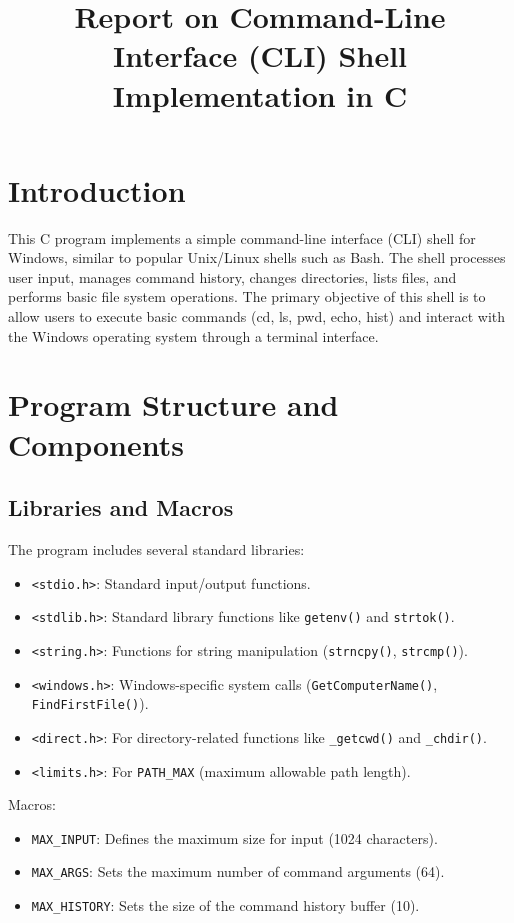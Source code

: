 \documentclass{article}
\title{Report on Command-Line Interface (CLI) Shell Implementation in C}
\author{}
\date{}
\begin{document}
\maketitle

\section{Introduction}

This C program implements a simple command-line interface (CLI) shell for Windows, similar to popular Unix/Linux shells such as Bash. The shell processes user input, manages command history, changes directories, lists files, and performs basic file system operations. The primary objective of this shell is to allow users to execute basic commands (cd, ls, pwd, echo, hist) and interact with the Windows operating system through a terminal interface.

\section{Program Structure and Components}

\subsection{Libraries and Macros}

The program includes several standard libraries:

\begin{itemize}
\item \texttt{<stdio.h>}: Standard input/output functions.
\item \texttt{<stdlib.h>}: Standard library functions like \texttt{getenv()} and \texttt{strtok()}.
\item \texttt{<string.h>}: Functions for string manipulation (\texttt{strncpy()}, \texttt{strcmp()}).
\item \texttt{<windows.h>}: Windows-specific system calls (\texttt{GetComputerName()}, \texttt{FindFirstFile()}).
\item \texttt{<direct.h>}: For directory-related functions like \texttt{\_getcwd()} and \texttt{\_chdir()}.
\item \texttt{<limits.h>}: For \texttt{PATH\_MAX} (maximum allowable path length).
\end{itemize}

Macros:

\begin{itemize}
\item \texttt{MAX\_INPUT}: Defines the maximum size for input (1024 characters).
\item \texttt{MAX\_ARGS}: Sets the maximum number of command arguments (64).
\item \texttt{MAX\_HISTORY}: Sets the size of the command history buffer (10).
\end{itemize}
\end{document}
